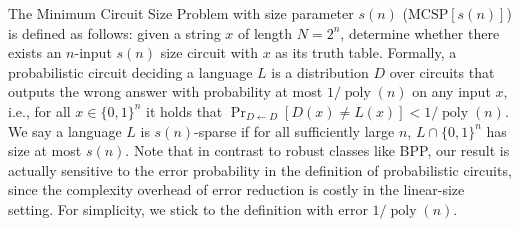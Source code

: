The Minimum Circuit Size Problem with size parameter $s(n)$ ($\mathrm{MCSP}[s(n)]$) is defined as follows: given a string $x$ of length $N=2^n$, determine whether there exists an $n$-input $s(n)$ size circuit with $x$ as its truth table.
Formally, a probabilistic circuit deciding a language $L$ is a distribution $D$ over circuits that outputs the wrong answer with probability at most $1/\operatorname{poly}(n)$ on any input $x$, i.e., for all $x\in\{0,1\}^n$ it holds that $\Pr_{D\leftarrow D}[D(x)\ne L(x)]<1/\operatorname{poly}(n)$. We say a language $L$ is $s(n)$-sparse if for all sufficiently large $n$, $L\cap\{0,1\}^n$ has size at most $s(n)$.
Note that in contrast to robust classes like BPP, our result is actually sensitive to the error probability in the definition of probabilistic circuits, since the complexity overhead of error reduction is costly in the linear-size setting. For simplicity, we stick to the definition with error $1/\operatorname{poly}(n)$.
